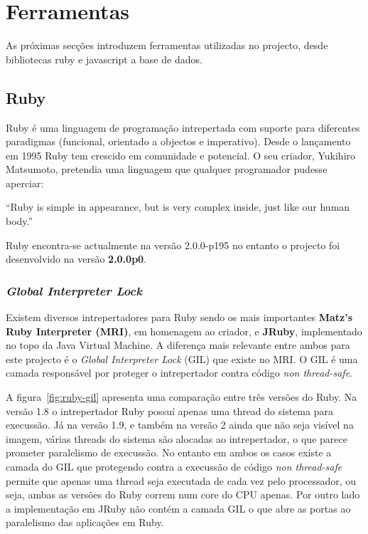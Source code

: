 \section{Ferramentas}

As próximas secções introduzem ferramentas utilizadas no projecto, desde bibliotecas ruby e javascript a base de dados.

\subsection{Ruby}

Ruby é uma linguagem de programação intrepertada com suporte para diferentes paradigmas (funcional, orientado a objectos e imperativo). Desde o lançamento em 1995 Ruby tem crescido em comunidade e potencial. O seu criador, Yukihiro Matsumoto, pretendia uma linguagem que qualquer programador pudesse aperciar:

``Ruby is simple in appearance, but is very complex inside, just like our human body.'' \cite{matz}

Ruby encontra-se actualmente na versão 2.0.0-p195 no entanto o projecto foi desenvolvido na versão \textbf{2.0.0p0}.

\subsubsection{\textit{Global Interpreter Lock}}

Existem diversos intrepertadores para Ruby sendo os mais importantes \textbf{Matz's Ruby Interpreter (MRI)}, em homenagem ao criador, e \textbf{JRuby}, implementado no topo da Java Virtual Machine. 
A diferença mais relevante entre ambos para este projecto é o \textit{Global Interpreter Lock} (GIL) que existe no MRI. O GIL é uma camada responsável por proteger o intrepertador contra código \textit{non thread-safe}.

A figura~\ref{fig:ruby-gil} apresenta uma comparação entre três versões do Ruby. Na versão 1.8 o intrepertador Ruby possuí apenas uma thread do sistema para execussão. Já na versão 1.9, e também na versão 2 ainda que não seja visível na imagem, várias threads do sistema são alocadas ao intrepertador, o que parece prometer paralelismo de execussão. No entanto em ambos os casos existe a camada do GIL que protegendo contra a execussão de código \textit{non thread-safe} permite que apenas uma thread seja executada de cada vez pelo processador, ou seja, ambas as versões do Ruby correm num core do CPU apenas.
Por outro lado a implementação em JRuby não contém a camada GIL o que abre as portas ao paralelismo das aplicações em Ruby.

